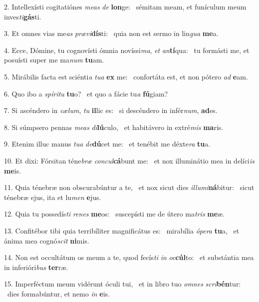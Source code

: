 2. Intellexísti cogitatiónes \textit{me}\textit{as} \textit{de} \textbf{lon}ge: \ast\  sémitam meam, et funículum meum inves\textit{ti}\textbf{gás}ti.\

3. Et omnes vias me\textit{as} \textit{præ}\textit{vi}\textbf{dís}ti: \ast\  quia non est sermo in lin\textit{gua} \textbf{me}a.\

4. Ecce, Dómine, tu cognovísti ómnia novíssi\textit{ma}, \textit{et} \textit{an}\textbf{tí}qua: \ast\  tu formásti me, et posuísti super me ma\textit{num} \textbf{tu}am.\

5. Mirábilis facta est sciénti\textit{a} \textit{tu}\textit{a} \textbf{ex} me: \ast\  confortáta est, et non pótero \textit{ad} \textbf{e}am.\

6. Quo ibo a \textit{spí}\textit{ri}\textit{tu} \textbf{tu}o? \ast\  et quo a fácie tu\textit{a} \textbf{fú}giam?\

7. Si ascéndero in \textit{cæ}\textit{lum}, \textit{tu} \textbf{il}lic es: \ast\  si descéndero in infér\textit{num}, \textbf{ad}es.\

8. Si súmpsero pennas \textit{me}\textit{as} \textit{di}\textbf{lú}culo, \ast\  et habitávero in extré\textit{mis} \textbf{ma}ris.\

9. Etenim illuc manus \textit{tu}\textit{a} \textit{de}\textbf{dú}cet me: \ast\  et tenébit me déxte\textit{ra} \textbf{tu}a.\

10. Et dixi: Fórsitan téne\textit{bræ} \textit{con}\textit{cul}\textbf{cá}bunt me: \ast\  et nox illuminátio mea in delíci\textit{is} \textbf{me}is.\

11. Quia ténebræ non obscurabúntur a te, \dag\  et nox sicut dies \textit{il}\textit{lu}\textit{mi}\textbf{ná}bitur: \ast\  sicut ténebræ ejus, ita et lu\textit{men} \textbf{e}jus.\

12. Quia tu possedís\textit{ti} \textit{re}\textit{nes} \textbf{me}os: \ast\  suscepísti me de útero ma\textit{tris} \textbf{me}æ.\

13. Confitébor tibi quia terribíliter magnificátus es: \dag\  mirabília \textit{ó}\textit{pe}\textit{ra} \textbf{tu}a, \ast\  et ánima mea cognó\textit{scit} \textbf{ni}mis.\

14. Non est occultátum os meum a te, quod fecís\textit{ti} \textit{in} \textit{oc}\textbf{cúl}to: \ast\  et substántia mea in inferióri\textit{bus} \textbf{ter}ræ.\

15. Imperféctum meum vidérunt óculi tui, \dag\  et in libro tuo \textit{om}\textit{nes} \textit{scri}\textbf{bén}tur: \ast\  dies formabúntur, et nemo \textit{in} \textbf{e}is.\

